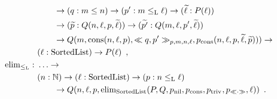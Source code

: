 \documentclass[orivec,envcountsame, ,envcountsect]{llncs}
\begin{document}
\begin{example}
\begin{align*}
                     & \qquad \to (q : m \leq n) \to (p' : m \lessList \ell) \to
                     (\stepind{\ell} : P(\ell)) \\ 
                     & \qquad \to (\stepind{p} : Q(n, \ell,p, \stepind{\ell}))
                     \to (\stepind{p'} : Q(m, \ell, p', \stepind{\ell})) \\
                     & \qquad \to Q(m,\consList{n}{\ell}{p}, \consLess{m}{n}{\ell}{p}{q}{p'}, p_{\consListbare}(n, \ell, p, \stepind{\ell}, \stepind{p}))) \to \\
                     & (\ell : \SortedList) \to P(\ell) \enspace , \\
%
  \elim_{\lessList} :\ & \ldots \to \\
                     & (n : \Nat) \to (\ell : \SortedList) \to (p : n \lessList \ell) \\
                     & \qquad \to Q(n, \ell, p, \elim_{\SortedList}(P, Q, p_{\nilList}, p_{\consListbare},  p_{\nilLess{}}, p_{\consLessbare}, \ell)) \enspace .
  \end{align*}
 \end{example}
\end{document}
